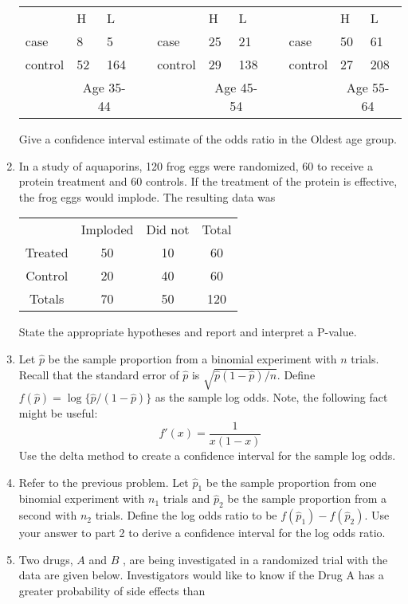 \documentclass[12pt]{article}
\begin{document}
\begin{enumerate}[Problem 1.]
\begin{center}
\begin{tabular}{lllclllclll}
& H & L & && H & L &&& H & L \\
case & 8 & 5 && case & 25 & 21& & case & 50 & 61 \\ 
control & 52 & 164 && control & 29 & 138& & control & 27 & 208 \vspace{+0.25in} \\
& \multicolumn{2}{c}{Age 35-44} &&& \multicolumn{2}{c}{Age 45-54}
&&& \multicolumn{2}{c}{Age 55-64}
\end{tabular} 
\end{center}
Give a confidence interval estimate of the odds ratio in the Oldest age group.
\item  In a study of aquaporins, 120 frog eggs were randomized, 60 to
  receive a protein treatment and 60 controls. If the treatment of
  the protein is effective, the frog eggs would implode. The resulting
  data was
    \begin{center}
      \begin{tabular}{cccc}
              & Imploded & Did not & Total \\
      Treated & 50        & 10       & 60     \\
      Control & 20        & 40       & 60     \\
      Totals  & 70        & 50       & 120    \\       
      \end{tabular}
    \end{center}
    State the appropriate hypotheses and report and interpret a
    P-value. 
\item Let $\hat p$ be the sample proportion from a binomial experiment
with $n$ trials.  Recall that the standard error of $\hat p$ is
$\sqrt{\hat p (1 - \hat p) / n}$. Define $f(\hat p) = \log\{\hat p /
(1 - \hat p)\}$ as the sample log odds.  Note, the following
  fact might be useful:
$$
f'(x) = \frac{1}{x(1 - x)}
$$
Use the delta method to create a confidence interval
  for the sample log odds.
\item Refer to the previous problem. Let $\hat p_1$ be the sample proportion from
  one binomial experiment with $n_1$ trials and $\hat p_2$ be the
  sample proportion from a second with $n_2$ trials. Define the log
  odds ratio to be $f(\hat p_1) - f(\hat p_2)$. Use your answer to
  part 2 to derive a confidence interval for the log odds ratio.
\item Two drugs, $A$ and $B$ , are being investigated in a randomized
  trial with the data are given below.  Investigators would like to
  know if the Drug A has a greater probability of side effects than

\end{enumerate}
\end{document}
